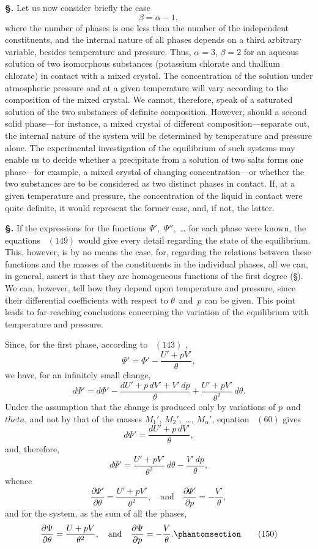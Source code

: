 \documentclass[12pt]{book}[2005/09/16]
\newcommand{\Chg}[2]{#2}
\newcommand{\Add}[1]{\Chg{}{#1}}
\newcommand{\Section}[1]{
  \medskip\par\textbf{§\;#1}
  \label{section:#1}
}
\newcommand{\SecRef}[2][§\;]{\hyperref[section:#2.]{{\upshape #1#2}}}
\newcommand{\Tag}[1]{%
  \phantomsection\label{eqn:#1}\tag*{\ensuremath{#1}}%
}
\newcommand{\Eq}[1]{%
  \hyperref[eqn:#1]{\ensuremath{#1}}%
}
\newcommand{\PageSep}[1]{\ignorespaces}
\newcommand{\dd}{\partial}
\begin{document}
\Section{209.} Let us now consider briefly the case
%
%
\[
\beta = \alpha - 1,
\]
where the number of phases is one less than the number of
the independent constituents, and the internal nature of
all phases depends on a third arbitrary variable, besides
temperature and pressure. Thus, $\alpha = 3$, $\beta = 2$ for an aqueous
solution of two isomorphous substances (potassium chlorate
%
and thallium chlorate) in contact with a mixed crystal. The
%
concentration of the solution under atmospheric pressure
and at a given temperature will vary according to the composition
of the mixed crystal. We cannot, therefore, speak
of a saturated solution of the two substances of definite
composition. However, should a second solid phase---for
\PageSep{183}
instance, a mixed crystal of different composition---separate
out, the internal nature of the system will be determined
by temperature and pressure alone. The experimental
investigation of the equilibrium of such systems may enable
us to decide whether a precipitate from a solution of two
salts forms one phase---for example, a mixed crystal of
changing concentration---or whether the two substances are
to be considered as two distinct phases in contact. If, at
a given temperature and pressure, the concentration of the
liquid in contact were quite definite, it would represent the
former case, and, if not, the latter.

\Section{210.} If the expressions for the functions $\Psi'$,~$\Psi''$,~\dots
for each phase were known, the equations~\Eq{(149)} would give
every detail regarding the state of the equilibrium. This,
however, is by no means the case, for, regarding the relations
between these functions and the masses of the constituents
in the individual phases, all we can, in general, assert is that
they are homogeneous functions of the first degree (\SecRef{201}).
We can, however, tell how they depend upon temperature
and pressure, since their differential coefficients with respect
to $\theta$~and~$p$ can be given. This point leads to far-reaching
conclusions concerning the variation of the equilibrium with
temperature and pressure.

Since, for the first phase, according to~\Eq{(143)},
\[
\Psi' = \Phi' - \frac{U' + pV'}{\theta},
\]
we have, for an infinitely small change,
\[
d\Psi' = d\Phi' - \frac{dU' + p\, dV' + V'\, dp}{\theta} + \frac{U' + pV'}{\theta^{2}}\, d\theta.
\]
Under the assumption that the change is produced only by
variations of $p$~and~$theta$, and not by that of the masses $M_{1}'$,
$M_{2}'$,~\dots\Add{,} $M_{\alpha}'$, equation~\Eq{(60)} gives
\[
d\Phi' = \frac{dU' + p\, dV'}{\theta},
\]
\PageSep{184}
and, therefore,
\[
d\Psi' = \frac{U' + pV'}{\theta^{2}}\, d\theta - \frac{V'\, dp}{\theta},
\]
whence
\[
\frac{\dd \Psi'}{\dd \theta} = \frac{U' + pV'}{\theta^{2}},
\quad\text{and}\quad
\frac{\dd \Psi'}{\dd p} = -\frac{V'}{\theta},
\]
and for the system, as the sum of all the phases,
\[
\frac{\dd \Psi}{\dd \theta} = \frac{U + pV}{\theta^{2}},
\quad\text{and}\quad
\frac{\dd \Psi}{\dd p} = -\frac{V}{\theta}.
\Tag{(150)}
\]
\end{document}
